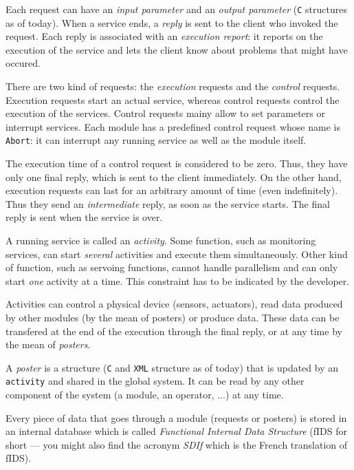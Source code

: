 Each request can  have an \emph{input parameter} and an  
\emph{output parameter} (\texttt{C} structures as  of today). When a service ends,
a   \emph{reply} is sent to   the   client who invoked  the 
request. Each reply  is  associated with an  \emph{execution  report}:  it
reports on the execution of  the service and  lets  the client  know about
problems that might have occured.

There are two kind of requests: the \emph{execution} requests and the 
\emph{control} requests. Execution requests  start  an actual service,  whereas
control requests control the  execution of the services. Control requests
mainy allow to set parameters or  interrupt services. Each module has  a
predefined control request whose name  is  \texttt{Abort}: it can  interrupt
any running service as well as the module itself.

The execution time of  a control request  is considered to be zero. Thus,
they have only one final reply, which is  sent to the client immediately.
On the other hand, execution requests can last for an arbitrary amount of
time (even indefinitely). Thus they send an \emph{intermediate} reply,  as
soon as the service 
starts.  The final reply is sent when the service is over.

A running  service is called an   \emph{activity}. Some function,  such as
monitoring services,  can start \emph{several}  activities and  execute them
simultaneously. Other  kind   of function,  such as   servoing functions,
cannot handle  parallelism  and can only  start  \emph{one} activity at  a
time. This constraint has to be indicated by the developer.

Activities can control a physical device (sensors, actuators), read  data
produced by  other modules (by  the mean of  posters) or produce
data. These data can  be transfered at the end  of the  execution through
the final reply, or at any time by the mean of \emph{posters}.

A \emph{poster} is a structure (\texttt{C} and \texttt{XML} structure as  of  
today) that is
updated by an \texttt{activity} and shared in the global system. It can be read by
any other component of the system (a module, an operator, ...) at any time.

Every piece  of data that goes through  a module (requests or posters) is
stored  in an internal database  which is called \emph{Functional Internal
Data Structure} (fIDS  for short --- you might  also find the acronym
\emph{SDIf} which is the French translation of fIDS).

